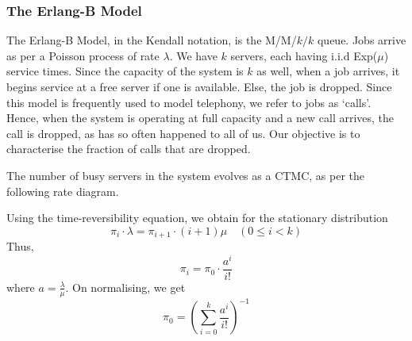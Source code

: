 \documentclass[12pt]{article}
\theoremstyle{definition}
\begin{document}
\subsubsection{The Erlang-B Model}

The Erlang-B Model, in the Kendall notation, is the M/M/$k/k$ queue. Jobs arrive as per a Poisson process of rate $\lambda$. We have $k$ servers, each having i.i.d Exp($\mu$) service times. Since the capacity of the system is $k$ as well, when a job arrives, it begins service at a free server if one is available. Else, the job is dropped. Since this model is frequently used to model telephony, we refer to jobs as `calls'. Hence, when the system is operating at full capacity and a new call arrives, the call is dropped, as has so often happened to all of us. Our objective is to characterise the fraction of calls that are dropped. 

The number of busy servers in the system evolves as a CTMC, as per the following rate diagram.

\begin{center}
\end{center}

Using the time-reversibility equation, we obtain for the stationary distribution
\[
    \pi_i \cdot \lambda = \pi_{i+1} \cdot (i+1)\mu \quad (0 \leq i < k)
\]
Thus, 
\[
    \pi_i = \pi_0 \cdot \frac{a^i}{i!}
\]
where $a = \frac{\lambda}{\mu}$. On normalising, we get
\[
    \pi_0 = \left( \sum_{i=0}^k \frac{a^i}{i!} \right)^{-1}
\]
\end{document}
